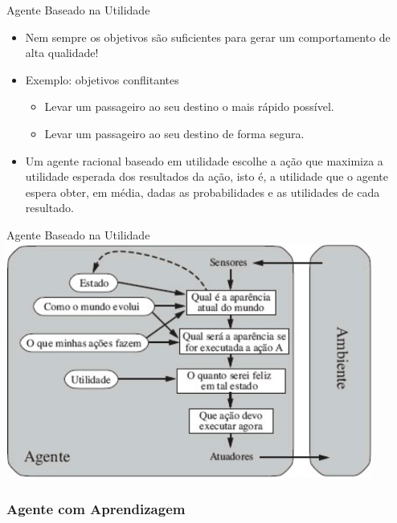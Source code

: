 \documentclass{libs/ufc_format}
\begin{document}
\begin{frame}{Agente Baseado na Utilidade}
    \begin{itemize}
        \justifying
        \item Nem sempre os objetivos são suficientes para gerar um comportamento de alta qualidade!
        \item Exemplo: objetivos conflitantes
            \begin{itemize}
                \justifying
                \item<2> Levar um passageiro ao seu destino o mais rápido possível.
                \item<2> Levar um passageiro ao seu destino de forma segura.
            \end{itemize}
        \item<3> Um agente racional baseado em utilidade escolhe a ação que maximiza a utilidade esperada dos resultados da ação, isto é, a utilidade que o agente espera obter, em média, dadas as probabilidades e as utilidades de cada resultado.
    \end{itemize}
\end{frame}

\begin{frame}{Agente Baseado na Utilidade}
    \centering
    \includegraphics[width=0.9\textwidth]{figuras/figura07}
\end{frame}

\subsubsection{Agente com Aprendizagem}
\end{document}
